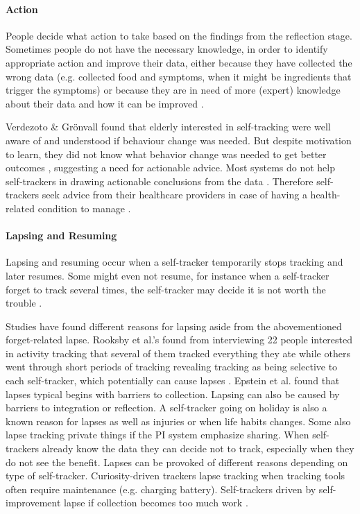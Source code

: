 \paragraph{Action}
People decide what action to take based on the findings from the reflection stage. Sometimes people do not have the necessary knowledge, in order to identify appropriate action and improve their data, either because they have collected the wrong data \citep{Choe2014, Chung2015} (e.g. collected food and symptoms, when it might be ingredients that trigger the symptoms) or because they are in need of more (expert) knowledge about their data and how it can be improved \citep{Verdezoto2015, Li2010, Oh2015}. 

Verdezoto \& Gr{\"o}nvall found that elderly interested in self-tracking were well aware of and understood if behaviour change was needed. But despite motivation to learn, they did not know what behavior change was needed to get better outcomes \citep{Verdezoto2015}, suggesting a need for actionable advice. Most systems do not help self-trackers in drawing actionable conclusions from the data \citep{Chung2015, Li2010}. Therefore self-trackers seek advice from their healthcare providers in case of having a health-related condition to manage \citep{Li2010}. 

\paragraph{Lapsing and Resuming}
Lapsing and resuming occur when a self-tracker temporarily stops tracking and later resumes. Some might even not resume, for instance when a self-tracker forget to track several times, the self-tracker may decide it is not worth the trouble \citep{Epstein2015}. 

Studies have found different reasons for lapsing aside from the abovementioned forget-related lapse. Rooksby et al.'s found from interviewing 22 people interested in activity tracking that several of them tracked everything they ate while others went through short periods of tracking revealing tracking as being selective to each self-tracker, which potentially can cause lapses \citep{Rooksby2014}. Epstein et al. found that lapses typical begins with barriers to collection. Lapsing can also be caused by barriers to integration or reflection. A self-tracker going on holiday is also a known reason for lapses as well as injuries or when life habits changes. Some also lapse tracking private things if the PI system emphasize sharing. When self-trackers already know the data they can decide not to track, especially when they do not see the benefit. Lapses can be provoked of different reasons depending on type of self-tracker. Curiosity-driven trackers lapse tracking when tracking tools often require maintenance (e.g. charging battery). Self-trackers driven by self-improvement lapse if collection becomes too much work \citep{Epstein2015}. 

